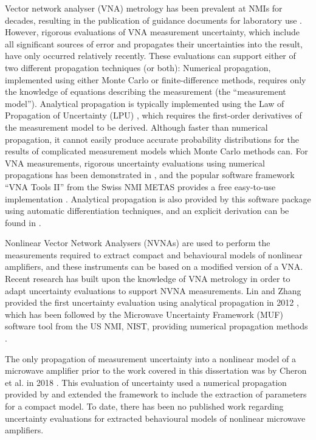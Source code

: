 \documentclass[../thesis/thesis.tex]{subfiles}
\begin{document}
Vector network analyser (VNA) metrology has been prevalent at NMIs for decades, resulting in the publication of guidance documents for laboratory use \cite{EA_2000,EURAMET_2011}. However, rigorous evaluations of VNA measurement uncertainty, which include all significant sources of error and propagates their uncertainties into the result, have only occurred relatively recently. These evaluations can support either of two different propagation techniques (or both): Numerical propagation, implemented using either Monte Carlo or finite-difference methods, requires only the knowledge of equations describing the measurement (the ``measurement model''). Analytical propagation is typically implemented using the Law of Propagation of Uncertainty (LPU) \cite{GUM_2008}, which requires the first-order derivatives of the measurement model to be derived. Although faster than numerical propagation, it cannot easily produce accurate probability distributions for the results of complicated measurement models which Monte Carlo methods can. For VNA measurements, rigorous uncertainty evaluations using numerical propagations has been demonstrated in \cite{Hoffman_2007}, and the popular software framework ``VNA Tools II'' from the Swiss NMI METAS provides a free easy-to-use implementation \cite{VNATools}. Analytical propagation is also provided by this software package using automatic differentiation techniques, and an explicit derivation can be found in \cite{Lewandowski_2010B}.

Nonlinear Vector Network Analysers (NVNAs) are used to perform the measurements required to extract compact and behavioural models of nonlinear amplifiers, and these instruments can be based on a modified version of a VNA. Recent research has built upon the knowledge of VNA metrology in order to adapt uncertainty evaluations to support NVNA measurements. Lin and Zhang provided the first uncertainty evaluation using analytical propagation in 2012 \cite{Lin_2012}, which has been followed by the Microwave Uncertainty Framework (MUF) software tool from the US NMI, NIST, providing numerical propagation methods \cite{MUFWebsite,Avolio_2015}.

The only propagation of measurement uncertainty into a nonlinear model of a microwave amplifier prior to the work covered in this dissertation was by Cheron et al. in 2018 \cite{Cheron_2018}. This evaluation of uncertainty used a numerical propagation provided by \cite{MUFWebsite} and extended the framework to include the extraction of parameters for a compact model. To date, there has been no published work regarding uncertainty evaluations for extracted behavioural models of nonlinear microwave amplifiers.
\end{document}
